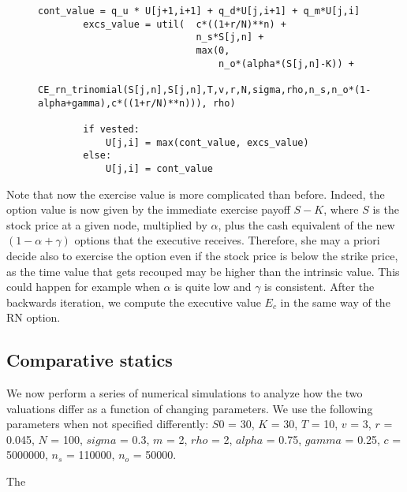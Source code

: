 \begin{figure}[H]
    \begin{lstlisting}[breaklines, basicstyle=\ttfamily\small]
        cont_value = q_u * U[j+1,i+1] + q_d*U[j,i+1] + q_m*U[j,i]
        excs_value = util(  c*((1+r/N)**n) +              
                            n_s*S[j,n] + 
                            max(0, 
                                n_o*(alpha*(S[j,n]-K)) + 
                                CE_rn_trinomial(S[j,n],S[j,n],T,v,r,N,sigma,rho,n_s,n_o*(1-alpha+gamma),c*((1+r/N)**n))), rho)

        if vested:
            U[j,i] = max(cont_value, excs_value)
        else: 
            U[j,i] = cont_value
    \end{lstlisting}
    \label{fig:ce_r}
\end{figure}



Note that now the exercise value is more complicated than before. Indeed, the option value is now given by the immediate exercise payoff $S-K$, where $S$ is the stock price at a given node, multiplied by $\alpha$, plus the cash equivalent of the new $(1-\alpha+\gamma)$ options that the executive receives. Therefore, she may a priori decide also to exercise the option even if the stock price is below the strike price, as the time value that gets recouped may be higher than the intrinsic value. This could happen for example when $\alpha$ is quite low and $\gamma$ is consistent. 
After the backwards iteration, we compute the executive value $E_c$ in the same way of the RN option.


\subsection{Comparative statics}
We now perform a series of numerical simulations to analyze how the two valuations differ as a function of changing parameters.
We use the following parameters when not specified differently: $S0$ = 30, $K$ = 30, $T$ = 10, $v$ = 3, $r$ = 0.045, $N$ = 100, $sigma$ = 0.3, $m$ = 2, $rho$ = 2, $alpha$ = 0.75, $gamma$ = 0.25, $c$ = 5000000, $n_s$ = 110000, $n_o$ = 50000.

The 







